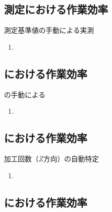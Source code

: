 \subsection{測定における作業効率}

\begin{Issues}{測定基準値の手動による実測\TBW}
\begin{enumerate}[label=\sarrow]
\item[{\sarrow[red]}]
\end{enumerate}
\end{Issues}


\subsection{\EndFacecutMilling における作業効率}

\begin{Issues}{\EndFacecutMilling の手動による\TDCorrection\TBW}
\begin{enumerate}[label=\sarrow]
\item[{\sarrow[red]}]
\end{enumerate}
\end{Issues}


\subsection{\KeywayMilling における作業効率}

\begin{Issues}{加工回数（$Z$方向）の自動特定\TBW}
\begin{enumerate}[label=\sarrow]
\item[{\sarrow[red]}]
\end{enumerate}
\end{Issues}


\subsection{\EndFaceChamferMilling における作業効率}

